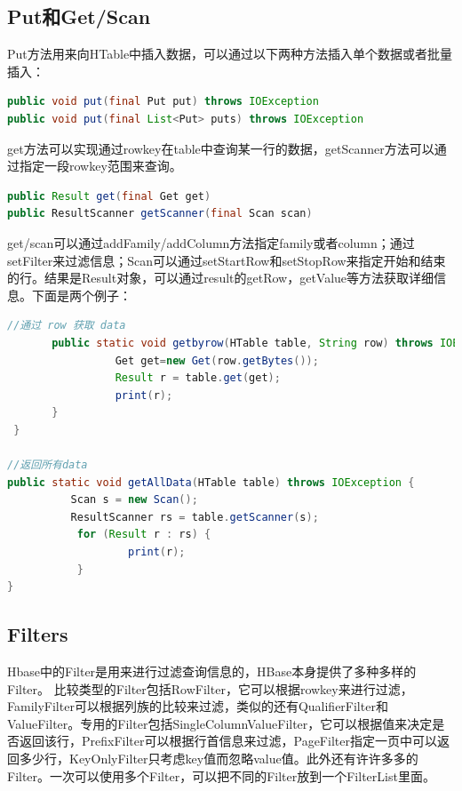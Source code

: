 \subsection{Put和Get/Scan}
Put方法用来向HTable中插入数据，可以通过以下两种方法插入单个数据或者批量插入：
\begin{lstlisting}[language=Java]
public void put(final Put put) throws IOException
public void put(final List<Put> puts) throws IOException
\end{lstlisting}

get方法可以实现通过rowkey在table中查询某一行的数据，getScanner方法可以通过指定一段rowkey范围来查询。

\begin{lstlisting}[language=Java]
public Result get(final Get get)
public ResultScanner getScanner(final Scan scan)
\end{lstlisting}

get/scan可以通过addFamily/addColumn方法指定family或者column；通过setFilter来过滤信息；Scan可以通过setStartRow和setStopRow来指定开始和结束的行。结果是Result对象，可以通过result的getRow，getValue等方法获取详细信息。下面是两个例子：

\begin{lstlisting}[language=Java]
//通过 row 获取 data
       public static void getbyrow(HTable table, String row) throws IOException { 
                 Get get=new Get(row.getBytes()); 
                 Result r = table.get(get); 
                 print(r); 
       }   
 } 

//返回所有data
public static void getAllData(HTable table) throws IOException { 
          Scan s = new Scan(); 
          ResultScanner rs = table.getScanner(s); 
           for (Result r : rs) { 
                   print(r); 
           } 
} 
\end{lstlisting}

\subsection{Filters}
Hbase中的Filter是用来进行过滤查询信息的，HBase本身提供了多种多样的Filter。
比较类型的Filter包括RowFilter，它可以根据rowkey来进行过滤，FamilyFilter可以根据列族的比较来过滤，类似的还有QualifierFilter和ValueFilter。专用的Filter包括SingleColumnValueFilter，它可以根据值来决定是否返回该行，PrefixFilter可以根据行首信息来过滤，PageFilter指定一页中可以返回多少行，KeyOnlyFilter只考虑key值而忽略value值。此外还有许许多多的Filter。一次可以使用多个Filter，可以把不同的Filter放到一个FilterList里面。

